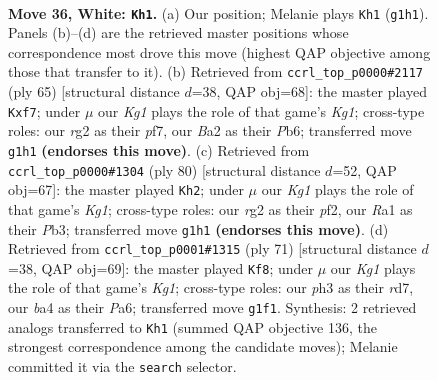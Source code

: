 \documentclass[11pt]{article}
\begin{document}
\clearpage

\begin{figure}[p]\centering
\begin{subfigure}{0.46\textwidth}\centering
\resizebox{\linewidth}{!}{%
\newchessgame
\chessboard[
  setfen={r7/pp3p2/5k2/7p/bP2P3/P5Pp/B5r1/R1R3K1 w - - 2 36},
  showmover=false,
  pgfstyle=straightmove, color=movearrow, markmove={g1-h1}
]}
\caption{}
\end{subfigure}\hfill
\begin{subfigure}{0.46\textwidth}\centering
\resizebox{\linewidth}{!}{%
\newchessgame
\chessboard[
  setfen={r2r2k1/5Pp1/1p1R4/p3Pb1p/8/1P6/1B5P/4R1K1 b - - 0 33},
  showmover=false,
  pgfstyle=straightmove, color=movearrow, markmove={g8-f7}
]}
\caption{}
\end{subfigure}
\\[4pt]
\begin{subfigure}{0.46\textwidth}\centering
\resizebox{\linewidth}{!}{%
\newchessgame
\chessboard[
  setfen={5rk1/1RR5/4p2p/p7/P2r2P1/1P5P/5p2/6K1 w - - 0 41},
  showmover=false,
  pgfstyle=straightmove, color=movearrow, markmove={g1-h2}
]}
\caption{}
\end{subfigure}\hfill
\begin{subfigure}{0.46\textwidth}\centering
\resizebox{\linewidth}{!}{%
\newchessgame
\chessboard[
  setfen={1rr3k1/1p1R2R1/p3p1p1/3n4/5P2/7P/PP4P1/6K1 b - - 8 36},
  showmover=false,
  pgfstyle=straightmove, color=movearrow, markmove={g8-f8}
]}
\caption{}
\end{subfigure}
\caption{\textbf{Move 36, White: \texttt{Kh1}.} (a) Our position; Melanie plays \texttt{Kh1} (\texttt{g1h1}). Panels (b)--(d) are the retrieved master positions whose correspondence most drove this move (highest QAP objective among those that transfer to it). (b) Retrieved from \texttt{ccrl\_top\_p0000\#2117} (ply 65) [structural distance $d$=38, QAP obj=68]: the master played \texttt{Kxf7}; under $\mu$ our \emph{Kg1} plays the role of that game's \emph{Kg1}; cross-type roles: our \emph{r}g2 as their \emph{p}f7, our \emph{B}a2 as their \emph{P}b6; transferred move \texttt{g1h1} \textbf{(endorses this move)}. (c) Retrieved from \texttt{ccrl\_top\_p0000\#1304} (ply 80) [structural distance $d$=52, QAP obj=67]: the master played \texttt{Kh2}; under $\mu$ our \emph{Kg1} plays the role of that game's \emph{Kg1}; cross-type roles: our \emph{r}g2 as their \emph{p}f2, our \emph{R}a1 as their \emph{P}b3; transferred move \texttt{g1h1} \textbf{(endorses this move)}. (d) Retrieved from \texttt{ccrl\_top\_p0001\#1315} (ply 71) [structural distance $d$=38, QAP obj=69]: the master played \texttt{Kf8}; under $\mu$ our \emph{Kg1} plays the role of that game's \emph{Kg1}; cross-type roles: our \emph{p}h3 as their \emph{r}d7, our \emph{b}a4 as their \emph{P}a6; transferred move \texttt{g1f1}. Synthesis: 2 retrieved analogs transferred to \texttt{Kh1} (summed QAP objective 136, the strongest correspondence among the candidate moves); Melanie committed it via the \texttt{search} selector.}
\label{fig:thought-m70}
\end{figure}
\end{document}

